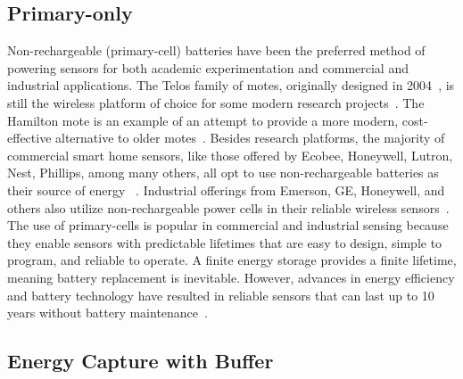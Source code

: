 \subsection{Primary-only}
Non-rechargeable (primary-cell) batteries have been the preferred
method of powering sensors for both academic experimentation
and commercial and industrial applications. 
The Telos family of motes, originally designed in 2004~\cite{polastre2005telos},
is still the wireless platform of choice for some modern research projects~\cite{mohammad2018codecast,li2019privacy}.
The Hamilton mote is an example of an attempt to provide a more modern, cost-effective alternative to older motes~\cite{andersen2017hamilton}.
Besides research platforms, the majority of commercial smart home sensors, like those offered by Ecobee, Honeywell, Lutron, Nest, Phillips, among many others, all opt to use non-rechargeable batteries as their source of energy
~\cite{ecobeeSensor, honeywellThermostat, lutronSolutions, googleNestTemperature, hueSensor}. 
Industrial offerings from Emerson, GE, Honeywell, and others also utilize non-rechargeable power cells in their reliable wireless sensors~\cite{emersonRosemount,GEInsightMesh,honeywellOneWireless}.
The use of primary-cells is popular in commercial and industrial sensing because they enable sensors with predictable lifetimes that are easy to
design, simple to program, and reliable to operate. 
A finite energy storage provides a finite lifetime, meaning battery replacement is inevitable. However, advances in energy efficiency and battery technology have resulted in reliable sensors that can last up to 10 years without battery maintenance~\cite{emersonRosemount,honeywellOneWireless, lutronSolutions}. 

\subsection{Energy Capture with Buffer}

